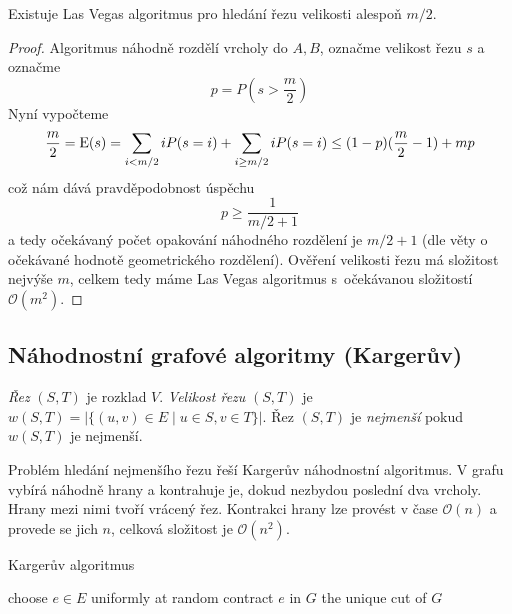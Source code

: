 \begin{theorem}
    Existuje Las Vegas algoritmus pro hledání řezu velikosti alespoň
    $m/2$.
\end{theorem}

\begin{proof}
    Algoritmus náhodně rozdělí vrcholy do $A, B$, označme velikost řezu
    $s$ a označme
    \[
    p = P(s > \frac{m}{2})
    \]
    Nyní vypočteme
    \[
        \frac{m}{2}
        = \operatorname{E}(s)
        = \sum_{i < m/2} i P(s = i)
        + \sum_{i \geq m/2} i P(s = i)
        \leq (1-p)(\frac{m}{2} - 1) + mp
    \]
    což nám dává pravděpodobnost úspěchu
    \[
        p \geq \frac{1}{m/2 + 1}
    \]
    a tedy očekávaný počet opakování náhodného rozdělení je $m/2 + 1$
    (dle věty o očekávané hodnotě geometrického rozdělení).
    Ověření velikosti řezu má složitost nejvýše $m$, celkem tedy máme
    Las Vegas algoritmus s~očekávanou složitostí $\mathcal{O}(m^2)$.
\end{proof}

\subsection{Náhodnostní grafové algoritmy (Kargerův)}

\begin{definition}
    {\em Řez} $(S,T)$ je rozklad $V$.
    {\em Velikost řezu} $(S,T)$ je
    $w(S,T) = \lvert \{ (u,v) \in E \mid u \in S, v \in T \} \rvert$.
    Řez $(S,T)$ je {\em nejmenší} pokud $w(S,T)$ je nejmenší.
\end{definition}

Problém hledání nejmenšího řezu řeší Kargerův náhodnostní algoritmus.
V grafu vybírá náhodně hrany a kontrahuje je, dokud nezbydou poslední
dva vrcholy. Hrany mezi nimi tvoří vrácený řez.
Kontrakci hrany lze provést v čase $\mathcal{O}(n)$ a provede se jich
$n$, celková složitost je $\mathcal{O}(n^2)$.

\begin{algorithm}
\caption{Kargerův algoritmus}
\label{alg:karger}
\begin{algorithmic}[1]
        \State choose $e \in E$ uniformly at random
        \State contract $e$ in $G$
    \EndWhile
    \State \Return the unique cut of $G$
\EndFunction
\end{algorithmic}
\end{algorithm}

